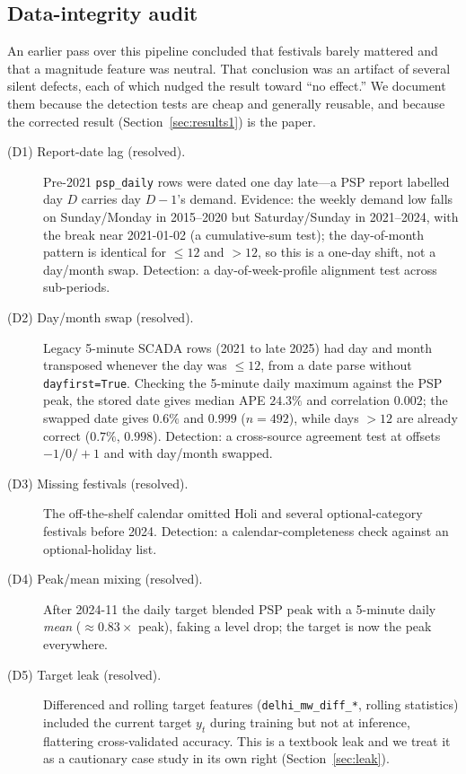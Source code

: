\documentclass[11pt]{article}
\newcommand{\pct}{\%}
\begin{document}
\subsection{Data-integrity audit}
\label{sec:integrity}

An earlier pass over this pipeline concluded that festivals barely mattered and
that a magnitude feature was neutral. That conclusion was an artifact of several
silent defects, each of which nudged the result toward ``no effect.'' We document
them because the detection tests are cheap and generally reusable, and because
the corrected result (Section~\ref{sec:results1}) is the paper.

\begin{description}
\item[\textnormal{(D1)} Report-date lag (resolved).] Pre-2021 \texttt{psp\_daily}
  rows were dated one day late---a PSP report labelled day $D$ carries day $D{-}1$'s
  demand. Evidence: the weekly demand low falls on Sunday/Monday in 2015--2020 but
  Saturday/Sunday in 2021--2024, with the break near 2021-01-02 (a cumulative-sum
  test); the day-of-month pattern is identical for $\le 12$ and $>12$, so this is a
  one-day shift, not a day/month swap. Detection: a day-of-week-profile alignment
  test across sub-periods.
\item[\textnormal{(D2)} Day/month swap (resolved).] Legacy 5-minute SCADA rows
  (2021 to late 2025) had day and month transposed whenever the day was $\le 12$,
  from a date parse without \texttt{dayfirst=True}. Checking the 5-minute daily
  maximum against the PSP peak, the stored date gives median APE $24.3\pct$ and
  correlation $0.002$; the swapped date gives $0.6\pct$ and $0.999$ ($n{=}492$),
  while days $>12$ are already correct ($0.7\pct$, $0.998$). Detection: a
  cross-source agreement test at offsets $-1/0/+1$ and with day/month swapped.
\item[\textnormal{(D3)} Missing festivals (resolved).] The off-the-shelf calendar
  omitted Holi and several optional-category festivals before 2024. Detection: a
  calendar-completeness check against an optional-holiday list.
\item[\textnormal{(D4)} Peak/mean mixing (resolved).] After 2024-11 the daily
  target blended PSP peak with a 5-minute daily \emph{mean} (${\approx}0.83\times$
  peak), faking a level drop; the target is now the peak everywhere.
\item[\textnormal{(D5)} Target leak (resolved).] Differenced and rolling target
  features (\texttt{delhi\_mw\_diff\_*}, rolling statistics) included the current
  target $y_t$ during training but not at inference, flattering cross-validated
  accuracy. This is a textbook leak and we treat it as a cautionary case study in
  its own right (Section~\ref{sec:leak}).
\end{description}
\end{document}
